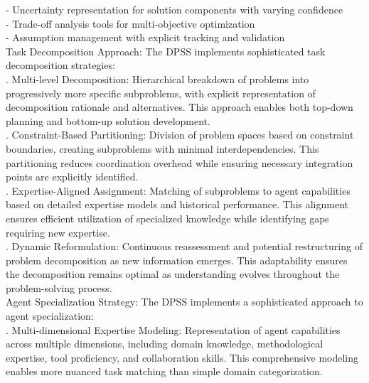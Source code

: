 - Uncertainty representation for solution components with varying confidence\\ \newline
- Trade-off analysis tools for multi-objective optimization\\ \newline
- Assumption management with explicit tracking and validation\\ \newline
Task Decomposition Approach: The DPSS implements sophisticated task decomposition strategies:\\ . Multi-level Decomposition: Hierarchical breakdown of problems into progressively more specific subproblems, with explicit representation of decomposition rationale and alternatives. This approach enables both top-down planning and bottom-up solution development.\\ . Constraint-Based Partitioning: Division of problem spaces based on constraint boundaries, creating subproblems with minimal interdependencies. This partitioning reduces coordination overhead while ensuring necessary integration points are explicitly identified.\\ . Expertise-Aligned Assignment: Matching of subproblems to agent capabilities based on detailed expertise models and historical performance. This alignment ensures efficient utilization of specialized knowledge while identifying gaps requiring new expertise.\\ . Dynamic Reformulation: Continuous reassessment and potential restructuring of problem decomposition as new information emerges. This adaptability ensures the decomposition remains optimal as understanding evolves throughout the problem-solving process.\\ \newline
Agent Specialization Strategy: The DPSS implements a sophisticated approach to agent specialization:\\ . Multi-dimensional Expertise Modeling: Representation of agent capabilities across multiple dimensions, including domain knowledge, methodological expertise, tool proficiency, and collaboration skills. This comprehensive modeling enables more nuanced task matching than simple domain categorization.\\ \newline
